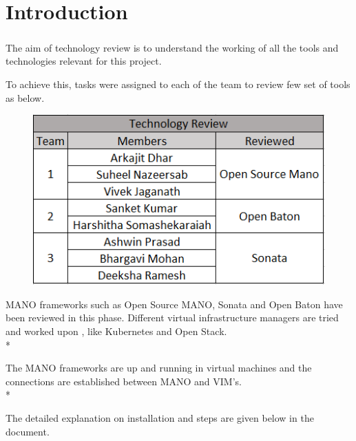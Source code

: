 \chapter{Introduction}
\label{ch:Introduction}

\paragraph{ }The aim of technology review is to understand the working of all the tools and technologies relevant for this project.

To achieve this, tasks were assigned to each of the team to review few set of tools as below. 

\begin{figure} [h]
\centering
\includegraphics[width=.5\linewidth]{figures/teams}
\end{figure}

MANO frameworks such as Open Source MANO, Sonata and Open Baton have been reviewed in this phase. Different virtual infrastructure managers are tried and worked upon , like Kubernetes and Open Stack.\\*

The MANO frameworks are up and running in virtual machines and the connections are established between MANO and VIM's.\\*

The detailed explanation on installation and steps are given below in the document.



